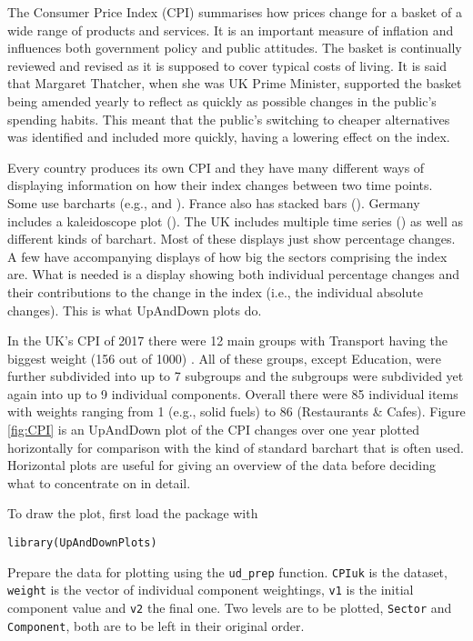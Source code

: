The Consumer Price Index (CPI) summarises how prices change for a basket of a wide range of products and services. It is an important measure of inflation and influences both government policy and public attitudes. The basket is continually reviewed and revised as it is supposed to cover typical costs of living. It is said that Margaret Thatcher, when she was UK Prime Minister, supported the basket being amended yearly to reflect as quickly as possible changes in the public's spending habits. This meant that the public's switching to cheaper alternatives was identified and included more quickly, having a lowering effect on the index.

Every country produces its own CPI and they have many different ways of displaying information on how their index changes between two time points. Some use barcharts (e.g., \citet{NBSChina:2024} and \citet{usa:2023}). France also has stacked bars (\citet{France:2017}). Germany includes a kaleidoscope plot (\citet{DeStatis:2024}). The UK includes multiple time series (\citet{uk:2024}) as well as different kinds of barchart. Most of these displays just show percentage changes. A few have accompanying displays of how big the sectors comprising the index are. What is needed is a display showing both individual percentage changes and their contributions to the change in the index (i.e., the individual absolute changes). This is what UpAndDown plots do.

In the UK's CPI of 2017 there were 12 main groups with Transport having the biggest weight (156 out of 1000) \citep{ons:2019}. All of these groups, except Education, were further subdivided into up to 7 subgroups and the subgroups were subdivided yet again into up to 9 individual components. Overall there were 85 individual items with weights ranging from 1 (e.g., solid fuels) to 86 (Restaurants \& Cafes). Figure \ref{fig:CPI} is an UpAndDown plot of the CPI changes over one year plotted horizontally for comparison with the kind of standard barchart that is often used. Horizontal plots are useful for giving an overview of the data before deciding what to concentrate on in detail.

To draw the plot, first load the package with

\texttt{library(UpAndDownPlots)}

Prepare the data for plotting using the \texttt{ud\_prep} function. \texttt{CPIuk} is the dataset, \texttt{weight} is the vector of individual component weightings, \texttt{v1} is the initial component value and \texttt{v2} the final one. Two levels are to be plotted, \texttt{Sector} and \texttt{Component}, both are to be left in their original order.

